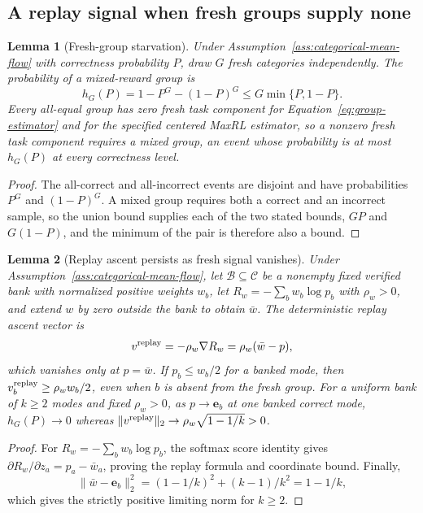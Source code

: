 \documentclass{article}
\newcommand{\enforcehalffinalproseline}{%
  \setlength{\parfillskip}{0pt plus .20\linewidth}}
\newcommand{\1}{\mathbf 1}
\newtheorem{lemma}{Lemma}[section]
\theoremstyle{remark}
\theoremstyle{definition}
\theoremstyle{plain}
\begin{document}
\subsection{A replay signal when fresh groups supply none}
\label{app:theory-gradient-availability}

\begin{lemma}[Fresh-group starvation]
\enforcehalffinalproseline
\label{lem:replay-gradient-availability}
Under Assumption~\ref{ass:categorical-mean-flow} with correctness probability
$P$, draw $G$ fresh categories independently. The probability of a
mixed-reward group is
\[
 h_G(P)=1-P^G-(1-P)^G\le G\min\{P,1-P\}.
\]
Every all-equal group has zero fresh task component for
Equation~\eqref{eq:group-estimator} and for the specified centered MaxRL
estimator, so a nonzero fresh task component requires a mixed group, an event
whose probability is at most $h_G(P)$ at every correctness level.
\end{lemma}

\begin{proof}
\enforcehalffinalproseline
The all-correct and all-incorrect events are disjoint and have probabilities
$P^G$ and $(1-P)^G$. A mixed group requires both a correct and an incorrect
sample, so the union bound supplies each of the two stated bounds, $GP$ and
$G(1-P)$, and the minimum of the pair is therefore also a bound.
\end{proof}

\begin{lemma}[Replay ascent persists as fresh signal vanishes]
\enforcehalffinalproseline
\label{lem:replay-ascent}
Under Assumption~\ref{ass:categorical-mean-flow}, let
$\mathcal B\subseteq\mathcal C$ be a nonempty fixed verified bank with
normalized positive weights $w_b$, let $R_w=-\sum_b w_b\log p_b$ with
$\rho_w>0$, and extend $w$ by zero outside the bank to obtain $\bar w$. The
deterministic replay ascent vector is
\[
 v^{\rm replay}=-\rho_w\nabla R_w=\rho_w(\bar w-p),
\]
which vanishes only at $p=\bar w$. If $p_b\le w_b/2$ for a banked mode, then
$v^{\rm replay}_b\ge\rho_w w_b/2$, even when $b$ is absent from the fresh
group. For a uniform bank of $k\ge2$ modes and fixed $\rho_w>0$, as
$p\to\mathbf e_b$ at one banked correct mode, $h_G(P)\to0$ whereas
$\|v^{\rm replay}\|_2\to\rho_w\sqrt{1-1/k}>0$.
\end{lemma}

\begin{proof}
\enforcehalffinalproseline
For $R_w=-\sum_b w_b\log p_b$, the softmax score identity gives
$\partial R_w/\partial z_a=p_a-\bar w_a$, proving the replay formula and
coordinate bound. Finally,
\[
 \|\bar w-\mathbf e_b\|_2^2=(1-1/k)^2+(k-1)/k^2=1-1/k,
\]
which gives the strictly positive limiting norm for $k\ge2$.
\end{proof}
\end{document}
